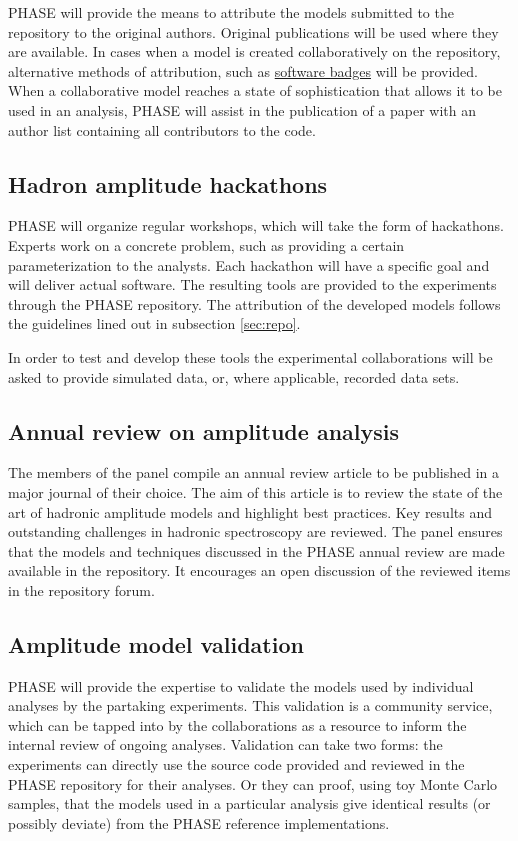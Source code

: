 PHASE will provide the means to attribute the models submitted to the repository to the original authors. Original publications will be used where they are available. In cases when a model is created collaboratively on the repository, alternative methods of attribution, such as \href{http://openbadges.org}{software badges} will be provided. When a collaborative model reaches a state of sophistication that allows it to be used in an analysis, PHASE will assist in the publication of a paper with an author list containing all contributors to the code.

\subsection{Hadron amplitude hackathons}
\label{sec:hackathon}
PHASE will organize regular workshops, which will take the form of hackathons. Experts work on a concrete problem, such as providing a certain parameterization to the analysts. Each hackathon will have a specific goal and will deliver actual software. The resulting tools are provided to the experiments through the PHASE repository. The attribution of the developed models follows the guidelines lined out in subsection \ref{sec:repo}.

In order to test and develop these tools the experimental collaborations will be asked to provide simulated data, or, where applicable, recorded data sets. 

\subsection{Annual review on amplitude analysis}
\label{rec:review}
The members of the panel compile an annual review article to be published in a major journal of their choice. The aim of this article is to review the state of the art of hadronic amplitude models and highlight best practices. Key results and outstanding challenges in hadronic spectroscopy are reviewed. The panel ensures that the models and techniques discussed in the PHASE annual review are made available in the repository. It encourages an open discussion of the reviewed items in the repository forum.

\subsection{Amplitude model validation}
\label{sec:validation}
PHASE will provide the expertise to validate the models used by individual analyses by the partaking experiments. This validation is a community service, which can be tapped into by the collaborations as a resource to inform the internal review of ongoing analyses. Validation can take two forms: the experiments can directly use the source code provided and reviewed in the PHASE repository for their analyses. Or they can proof, using toy Monte Carlo samples, that the models used in a particular analysis give identical results (or possibly deviate) from the PHASE reference implementations.

